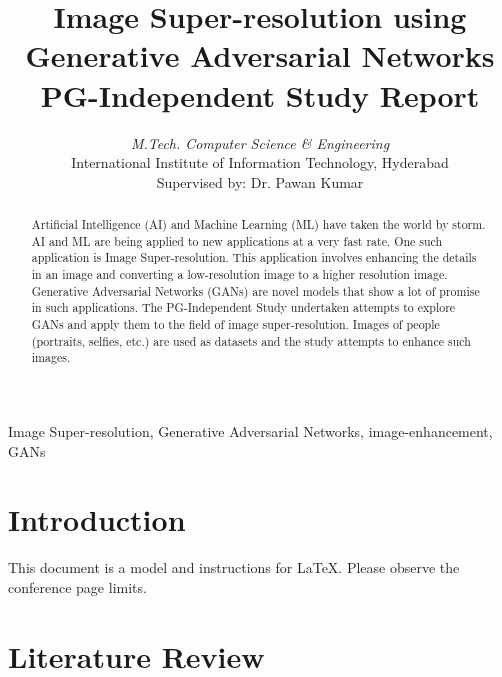 \documentclass[conference]{IEEEtran}
\begin{document}
	
	\title{Image Super-resolution using \\ Generative Adversarial Networks\\
		{\large PG-Independent Study Report}
		\vspace{-3mm}
	}

	
	\author{
			\textit{M.Tech. Computer Science \& Engineering}\\
			International Institute of Information Technology, Hyderabad \\
				Supervised by: Dr. Pawan Kumar
		}
		
	
	\maketitle
	
	\begin{abstract}
		Artificial Intelligence (AI) and Machine Learning (ML) have taken the world by storm. AI and ML are being applied to new applications at a very fast rate. One such application is Image Super-resolution. This application involves enhancing the details in an image and converting a low-resolution image to a higher resolution image. Generative Adversarial Networks (GANs) are novel models that show a lot of promise in such applications. The PG-Independent Study undertaken attempts to explore GANs and apply them to the field of image super-resolution. Images of people (portraits, selfies, etc.) are used as datasets and the study attempts to enhance such images.
	\end{abstract}
	
	\begin{IEEEkeywords}
		Image Super-resolution, Generative Adversarial Networks, image-enhancement, GANs
	\end{IEEEkeywords}
	
	\section{Introduction}
		This document is a model and instructions for \LaTeX.
		Please observe the conference page limits. 
	
	\section{Literature Review}
	
\end{document}
